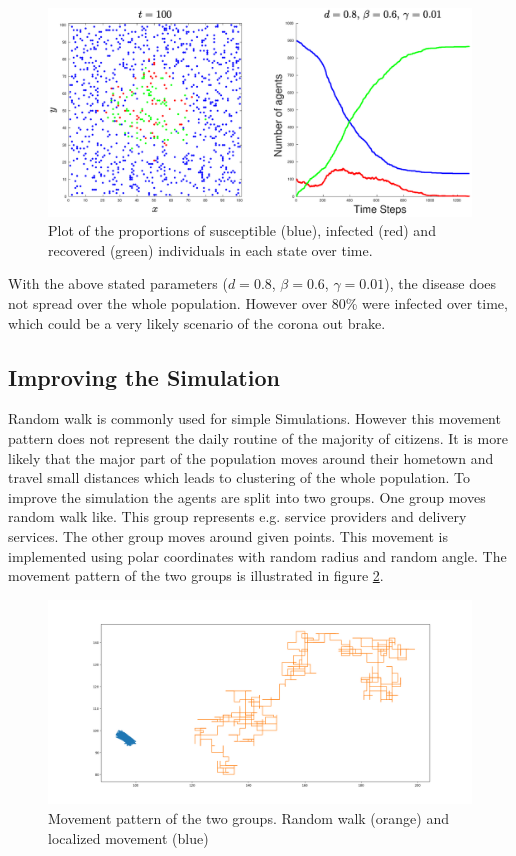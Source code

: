 \begin{figure}[H]
	\centering
	\includegraphics[width=0.9\linewidth]{1_1000_agents}
	\caption{Plot of the proportions of susceptible (blue), infected (red) and recovered (green) individuals in each state over time.}%
	\label{fig:2}
\end{figure}

With the above stated parameters ($d=0.8$, $\beta=0.6$, $\gamma=0.01$), the disease does not spread over the whole population. However over 80\% were infected over time, which could be a very likely scenario of the corona out brake.

\subsection{Improving the Simulation}
Random walk is commonly used for simple Simulations. However this movement pattern does not represent the daily routine of the majority of citizens. It  is more likely that the major part of the population moves around their hometown and travel small distances which leads to clustering of the whole population. To improve the simulation the agents are split into two groups. One group moves random walk like. This group represents e.g. service providers and delivery services. The other group moves around given points. This movement is implemented using polar coordinates with random radius and random angle. The movement pattern of the two groups is illustrated in figure \ref{fig:movementPattern}. 
\begin{figure}[H]
	\centering
	\includegraphics[width=0.9\linewidth]{img/movementPattern.png}
	\caption{Movement pattern of the two groups. Random walk (orange) and localized movement (blue)}%
	\label{fig:movementPattern}
\end{figure}

